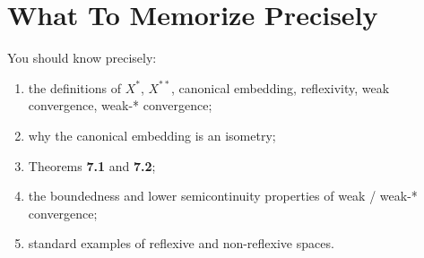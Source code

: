 \documentclass[11pt]{article}
\begin{document}
\section{What To Memorize Precisely}

\begin{focusbox}
You should know precisely:
\begin{enumerate}
\item the definitions of $X^*$, $X^{**}$, canonical embedding, reflexivity, weak convergence, weak-* convergence;
\item why the canonical embedding is an isometry;
\item Theorems \textbf{7.1} and \textbf{7.2};
\item the boundedness and lower semicontinuity properties of weak / weak-* convergence;
\item standard examples of reflexive and non-reflexive spaces.
\end{enumerate}
\end{focusbox}
\end{document}
